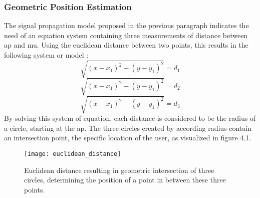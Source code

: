 \subsubsection{Geometric Position Estimation}
The signal propagation model proposed in the previous paragraph indicates the need of an equation system containing three measurements of distance between \acrshort{ap} and \acrlong{mu}. Using the euclidean distance between two points, this results in the following system or model \cite{CutTheKnot}:
\[ \sqrt{(x-x_1)^2 - (y-y_1)^2} = d_1 \]
\[ \sqrt{(x-x_1)^2 - (y-y_1)^2} = d_2 \]
\[ \sqrt{(x-x_1)^2 - (y-y_1)^2} = d_3 \]
By solving this system of equation, each distance is considered to be the radius of a circle, starting at the \acrshort{ap}. The three circles created by according radius contain an intersection point, the specific location of the user, as visualized in figure 4.1.
\begin{figure}[h!]
\centering
\texttt{[image: euclidean\_distance]}
\caption{Euclidean distance resulting in geometric intersection of three circles, determining the position of a point in between these three points.}
\label{fig:euclidean}
\end{figure}
